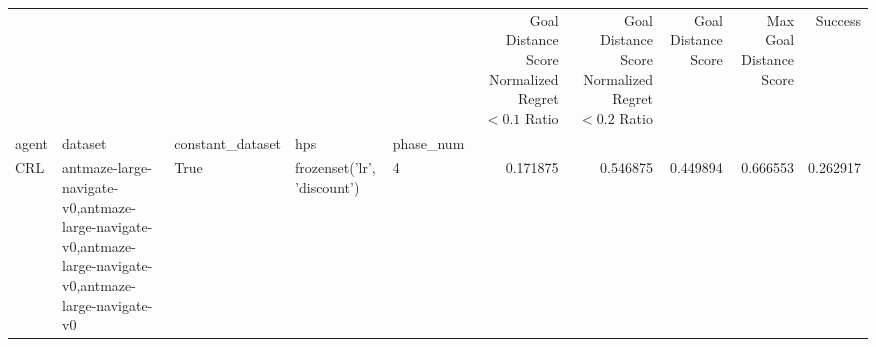 \begin{tabular}{lllllrrrrr}
\toprule
 &  &  &  &  & Goal Distance Score Normalized Regret $< 0.1$ Ratio & Goal Distance Score Normalized Regret $< 0.2$ Ratio & Goal Distance Score & Max Goal Distance Score & Success \\
agent & dataset & constant_dataset & hps & phase_num &  &  &  &  &  \\
\midrule
CRL & antmaze-large-navigate-v0,antmaze-large-navigate-v0,antmaze-large-navigate-v0,antmaze-large-navigate-v0 & True & frozenset({'lr', 'discount'}) & 4 & 0.171875 & 0.546875 & 0.449894 & 0.666553 & 0.262917 \\
\cline{1-10} \cline{2-10} \cline{3-10} \cline{4-10}
\bottomrule
\end{tabular}
